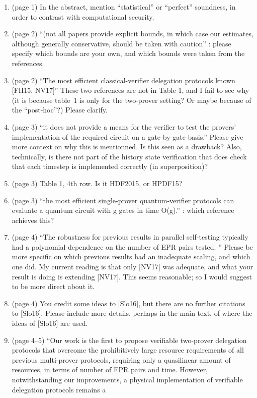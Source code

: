\documentclass[12pt]{article}
\begin{document}
\begin{enumerate}
\item (page 1) In the abstract, mention ``statistical'' or ``perfect'' soundness, in order to contrast with computational security.
\item (page 2) ``(not all papers provide explicit bounds, in which case
our estimates, although generally conservative, should be taken with caution'' : please specify which bounds are your own, and which bounds were taken from the references.
\item (page 2) ``The most efficient classical-verifier delegation protocols known [FH15, NV17]'' These two references are not in Table 1, and I fail to see why (it is because table~1 is only for the two-prover setting? Or maybe because of the ``post-hoc''?) Please clarify.
\item (page 3) ``it does not provide a means for the verifier to test
the provers’ implementation of the required circuit on a gate-by-gate basis.'' Please give more context on why this is mentionned. Is this seen as a drawback? Also, technically, is there not part of the history state verification that does check that each timestep is implemented correctly (in superposition)?
\item (page 3) Table 1, 4th row. Is it HDF2015, or HPDF15?
\item (page 3) ``the most
efficient single-prover quantum-verifier protocols can evaluate a quantum circuit with g gates in time O(g).'' : which reference achieves this?
\item (page 4) ``The robustness for
previous results in parallel self-testing typically had a polynomial dependence on the number of EPR pairs
tested. '' Please be more specific on which previous results had an inadequate scaling, and which one did. My current reading is that only [NV17] was adequate, and what your result is doing is extending [NV17]. This seems reasonable; so I would suggest to be more direct about it.
\item (page 4) You credit some ideas to [Slo16], but there are no further citations to [Slo16]. Please include more details, perhaps in the main text, of where the ideas of [Slo16] are used.
    \item (page 4--5) ``Our work is the first to propose verifiable two-prover delegation
protocols that overcome the prohibitively large resource requirements of all previous multi-prover protocols, requiring only a quasilinear amount of resources, in terms of number of EPR pairs and time. However,
notwithstanding our improvements, a physical implementation of verifiable delegation protocols remains a

\end{enumerate}
\end{document}
